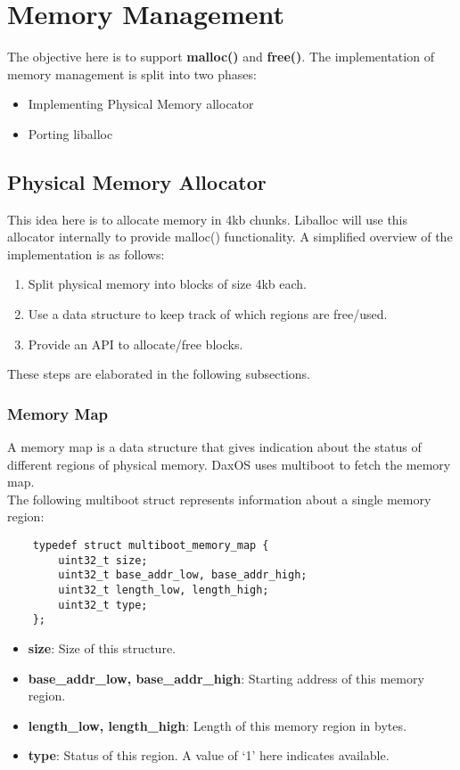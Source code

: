 \chapter{Memory Management}\label{chapter:Memory Management}

The objective here is to support \textbf{malloc()} and \textbf{free()}.
The implementation of memory management is split into two phases:
\begin{itemize}
    \item Implementing Physical Memory allocator
    \item Porting liballoc
\end{itemize}

\section{Physical Memory Allocator}\label{section:Physical Memory Allocator}

This idea here is to allocate memory in 4kb chunks. Liballoc will use this allocator internally to provide malloc()
functionality. A simplified overview of the implementation is as follows:
\begin{enumerate}
    \item Split physical memory into blocks of size 4kb each.
    \item Use a data structure to keep track of which regions are free/used.
    \item Provide an API to allocate/free blocks.
\end{enumerate} 
These steps are elaborated in the following subsections.
\pagebreak

\subsection{Memory Map}\label{subsection:Memory Map}
A memory map is a data structure that gives indication about the status of different regions of physical memory.
DaxOS uses multiboot to fetch the memory map. \\

The following multiboot struct represents information about a single memory\\ region:
\begin{lstlisting}
    typedef struct multiboot_memory_map {
        uint32_t size;
        uint32_t base_addr_low, base_addr_high;
        uint32_t length_low, length_high;
        uint32_t type;
    };
\end{lstlisting}
\begin{itemize}
    \item \textbf{size}: Size of this structure. 
    \item \textbf{base\_addr\_low, base\_addr\_high}: Starting address of this memory region.
    \item \textbf{length\_low, length\_high}: Length of this memory region in bytes.
    \item \textbf{type}: Status of this region. A value of `1' here indicates available.
\end{itemize}


